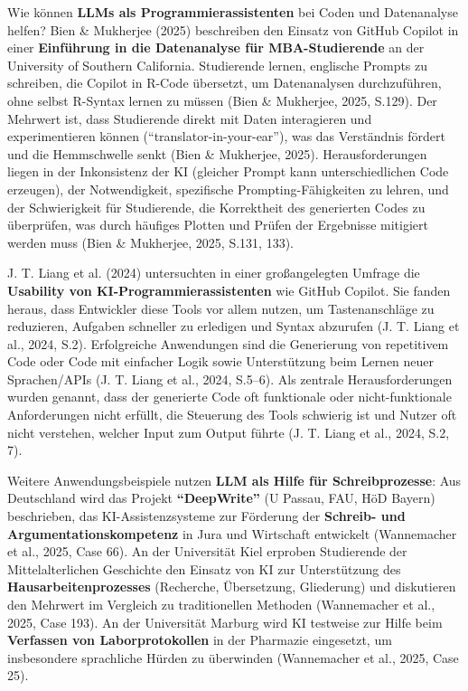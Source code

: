\documentclass[
  ngerman,
  letterpaper,
  DIV=11]{scrreprt}
\begin{document}
Wie können \textbf{LLMs als Programmierassistenten} bei Coden und
Datenanalyse helfen? Bien \& Mukherjee (2025) beschreiben den Einsatz
von GitHub Copilot in einer \textbf{Einführung in die Datenanalyse für
MBA-Studierende} an der University of Southern California. Studierende
lernen, englische Prompts zu schreiben, die Copilot in R-Code übersetzt,
um Datenanalysen durchzuführen, ohne selbst R-Syntax lernen zu müssen
(Bien \& Mukherjee, 2025, S.129). Der Mehrwert ist, dass Studierende
direkt mit Daten interagieren und experimentieren können
(``translator-in-your-ear''), was das Verständnis fördert und die
Hemmschwelle senkt (Bien \& Mukherjee, 2025). Herausforderungen liegen
in der Inkonsistenz der KI (gleicher Prompt kann unterschiedlichen Code
erzeugen), der Notwendigkeit, spezifische Prompting-Fähigkeiten zu
lehren, und der Schwierigkeit für Studierende, die Korrektheit des
generierten Codes zu überprüfen, was durch häufiges Plotten und Prüfen
der Ergebnisse mitigiert werden muss (Bien \& Mukherjee, 2025, S.131,
133).

J. T. Liang et al. (2024) untersuchten in einer großangelegten Umfrage
die \textbf{Usability von KI-Programmierassistenten} wie GitHub Copilot.
Sie fanden heraus, dass Entwickler diese Tools vor allem nutzen, um
Tastenanschläge zu reduzieren, Aufgaben schneller zu erledigen und
Syntax abzurufen (J. T. Liang et al., 2024, S.2). Erfolgreiche
Anwendungen sind die Generierung von repetitivem Code oder Code mit
einfacher Logik sowie Unterstützung beim Lernen neuer Sprachen/APIs (J.
T. Liang et al., 2024, S.5--6). Als zentrale Herausforderungen wurden
genannt, dass der generierte Code oft funktionale oder nicht-funktionale
Anforderungen nicht erfüllt, die Steuerung des Tools schwierig ist und
Nutzer oft nicht verstehen, welcher Input zum Output führte (J. T. Liang
et al., 2024, S.2, 7).

Weitere Anwendungsbeispiele nutzen \textbf{LLM als Hilfe für
Schreibprozesse}: Aus Deutschland wird das Projekt
\textbf{``DeepWrite''} (U Passau, FAU, HöD Bayern) beschrieben, das
KI-Assistenzsysteme zur Förderung der \textbf{Schreib- und
Argumentationskompetenz} in Jura und Wirtschaft entwickelt (Wannemacher
et al., 2025, Case 66). An der Universität Kiel erproben Studierende der
Mittelalterlichen Geschichte den Einsatz von KI zur Unterstützung des
\textbf{Hausarbeitenprozesses} (Recherche, Übersetzung, Gliederung) und
diskutieren den Mehrwert im Vergleich zu traditionellen Methoden
(Wannemacher et al., 2025, Case 193). An der Universität Marburg wird KI
testweise zur Hilfe beim \textbf{Verfassen von Laborprotokollen} in der
Pharmazie eingesetzt, um insbesondere sprachliche Hürden zu überwinden
(Wannemacher et al., 2025, Case 25).
\end{document}

